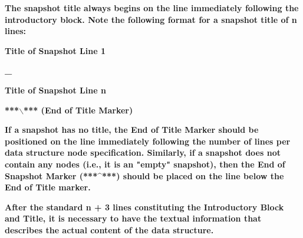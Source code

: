 \documentclass[12pt]{article}
\begin{document}
\begin{flushleft}

\end{flushleft}

\begin{flushleft}
\textbf{{\footnotesize{}The snapshot title always begins on the line immediately following the introductory block.  Note the following format for a snapshot title of n lines:}}
\end{flushleft}

\begin{flushleft}

\end{flushleft}

\begin{flushleft}
\textbf{{\footnotesize{}Title of Snapshot  Line 1}}
\end{flushleft}

\begin{flushleft}
\textbf{{\footnotesize{}    \_}}
\end{flushleft}

\begin{flushleft}
\textbf{{\footnotesize{}Title of Snapshot  Line n}}
\end{flushleft}

\begin{flushleft}
\textbf{{\footnotesize{}***\ensuremath{\backslash}***  (End of Title Marker)}}
\end{flushleft}

\begin{flushleft}

\end{flushleft}

\begin{flushleft}
\textbf{{\footnotesize{}If a snapshot has no title, the End of Title Marker should be positioned on the line immediately following the number of lines per data structure node specification.  Similarly,  if a snapshot does not contain any nodes (i.e., it is an "empty" snapshot), then the End of Snapshot Marker (***\^{}***) should be placed on the line below the End of Title marker.}}
\end{flushleft}

\begin{flushleft}

\end{flushleft}

\begin{flushleft}
\textbf{{\footnotesize{}After the standard n + 3 lines constituting the Introductory Block and Title, it is necessary to have the textual information that describes the actual content of the data structure.}}
\end{flushleft}
\end{document}
